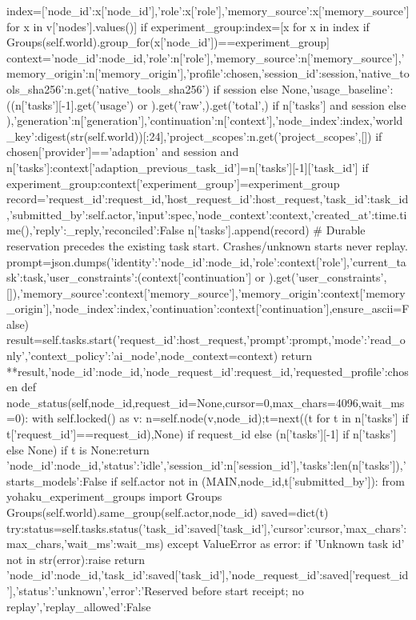    index=[{'node_id':x['node_id'],'role':x['role'],'memory_source':x['memory_source']} for x in v['nodes'].values()]
   if experiment_group:index=[x for x in index if Groups(self.world).group_for(x['node_id'])==experiment_group]
   context={'node_id':node_id,'role':n['role'],'memory_source':n['memory_source'],'memory_origin':n['memory_origin'],'profile':chosen,'session_id':session,'native_tools_sha256':n.get('native_tools_sha256') if session else None,'usage_baseline':((n['tasks'][-1].get('usage') or {}).get('raw',{}).get('total',{}) if n['tasks'] and session else {}),'generation':n['generation'],'continuation':n['context'],'node_index':index,'world_key':digest(str(self.world))[:24],'project_scopes':n.get('project_scopes',[])}
   if chosen['provider']=='adaption' and session and n['tasks']:context['adaption_previous_task_id']=n['tasks'][-1]['task_id']
   if experiment_group:context['experiment_group']=experiment_group
   record={'request_id':request_id,'host_request_id':host_request,'task_id':task_id,'submitted_by':self.actor,'input':spec,'node_context':context,'created_at':time.time(),'reply':_reply,'reconciled':False}
   n['tasks'].append(record)
  # Durable reservation precedes the existing task start. Crashes/unknown starts never replay.
  prompt=json.dumps({'identity':{'node_id':node_id,'role':context['role']},'current_task':task,'user_constraints':(context['continuation'] or {}).get('user_constraints',[]),'memory_source':context['memory_source'],'memory_origin':context['memory_origin'],'node_index':index,'continuation':context['continuation']},ensure_ascii=False)
  result=self.tasks.start({'request_id':host_request,'prompt':prompt,'mode':'read_only','context_policy':'ai_node'},node_context=context)
  return {**result,'node_id':node_id,'node_request_id':request_id,'requested_profile':chosen}
 def node_status(self,node_id,request_id=None,cursor=0,max_chars=4096,wait_ms=0):
  with self.locked() as v:
   n=self.node(v,node_id);t=next((t for t in n['tasks'] if t['request_id']==request_id),None) if request_id else (n['tasks'][-1] if n['tasks'] else None)
   if t is None:return {'node_id':node_id,'status':'idle','session_id':n['session_id'],'tasks':len(n['tasks']),'starts_models':False}
   if self.actor not in (MAIN,node_id,t['submitted_by']):
    from yohaku_experiment_groups import Groups
    Groups(self.world).same_group(self.actor,node_id)
   saved=dict(t)
  try:status=self.tasks.status({'task_id':saved['task_id'],'cursor':cursor,'max_chars':max_chars,'wait_ms':wait_ms})
  except ValueError as error:
   if 'Unknown task id' not in str(error):raise
   return {'node_id':node_id,'task_id':saved['task_id'],'node_request_id':saved['request_id'],'status':'unknown','error':'Reserved before start receipt; no replay','replay_allowed':False}
